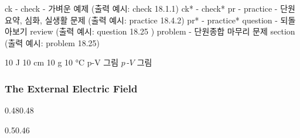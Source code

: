 
ck - check - 가벼운 예제 (출력 예시: check 18.1.1)
ck* - check* 
pr - practice - 단원 요약, 심화, 실생활 문제 (출력 예시: practice 18.4.2)
pr* - practice*
question - 되돌아보기 review (출력 예시: question 18.25 )
problem - 단원종합 마무리 문제 section (출력 예시: problem 18.25)


10 J 		
10 cm		
10 g		
10 °C           
p-V 그림        $p\,$-$V$ 그림


\addtocounter{figure}{1}%
\addtocounter{equation}{1}%


\subsubsection{The External Electric Field}



\zzz \bd{\itl{}}

\memo{}


\begin{doublebox}{0.48}{0.48}{

}{

}
\end{doublebox}


\begin{doublebox}{0.5}{0.46}{

}{
\zz[0.2\bs]

}
\end{doublebox}

